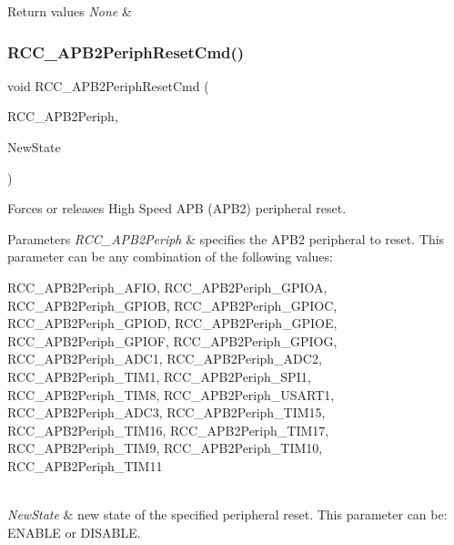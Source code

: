 \begin{DoxyRetVals}{Return values}
{\em None} & \\
\hline
\end{DoxyRetVals}
\mbox{\label{group___r_c_c___exported___functions_gad94553850ac07106a27ee85fec37efdf}} 
\subsubsection{\texorpdfstring{RCC\_APB2PeriphResetCmd()}{RCC\_APB2PeriphResetCmd()}}
{\footnotesize\ttfamily void R\+C\+C\+\_\+\+A\+P\+B2\+Periph\+Reset\+Cmd (\begin{DoxyParamCaption}\item[{uint32\+\_\+t}]{R\+C\+C\+\_\+\+A\+P\+B2\+Periph,  }\item[{\mbox{\hyperlink{group___exported__types_gac9a7e9a35d2513ec15c3b537aaa4fba1}{Functional\+State}}}]{New\+State }\end{DoxyParamCaption})}



Forces or releases High Speed A\+PB (A\+P\+B2) peripheral reset. 


\begin{DoxyParams}{Parameters}
{\em R\+C\+C\+\_\+\+A\+P\+B2\+Periph} & specifies the A\+P\+B2 peripheral to reset. This parameter can be any combination of the following values\+: \begin{DoxyItemize}
\item R\+C\+C\+\_\+\+A\+P\+B2\+Periph\+\_\+\+A\+F\+IO, R\+C\+C\+\_\+\+A\+P\+B2\+Periph\+\_\+\+G\+P\+I\+OA, R\+C\+C\+\_\+\+A\+P\+B2\+Periph\+\_\+\+G\+P\+I\+OB, R\+C\+C\+\_\+\+A\+P\+B2\+Periph\+\_\+\+G\+P\+I\+OC, R\+C\+C\+\_\+\+A\+P\+B2\+Periph\+\_\+\+G\+P\+I\+OD, R\+C\+C\+\_\+\+A\+P\+B2\+Periph\+\_\+\+G\+P\+I\+OE, R\+C\+C\+\_\+\+A\+P\+B2\+Periph\+\_\+\+G\+P\+I\+OF, R\+C\+C\+\_\+\+A\+P\+B2\+Periph\+\_\+\+G\+P\+I\+OG, R\+C\+C\+\_\+\+A\+P\+B2\+Periph\+\_\+\+A\+D\+C1, R\+C\+C\+\_\+\+A\+P\+B2\+Periph\+\_\+\+A\+D\+C2, R\+C\+C\+\_\+\+A\+P\+B2\+Periph\+\_\+\+T\+I\+M1, R\+C\+C\+\_\+\+A\+P\+B2\+Periph\+\_\+\+S\+P\+I1, R\+C\+C\+\_\+\+A\+P\+B2\+Periph\+\_\+\+T\+I\+M8, R\+C\+C\+\_\+\+A\+P\+B2\+Periph\+\_\+\+U\+S\+A\+R\+T1, R\+C\+C\+\_\+\+A\+P\+B2\+Periph\+\_\+\+A\+D\+C3, R\+C\+C\+\_\+\+A\+P\+B2\+Periph\+\_\+\+T\+I\+M15, R\+C\+C\+\_\+\+A\+P\+B2\+Periph\+\_\+\+T\+I\+M16, R\+C\+C\+\_\+\+A\+P\+B2\+Periph\+\_\+\+T\+I\+M17, R\+C\+C\+\_\+\+A\+P\+B2\+Periph\+\_\+\+T\+I\+M9, R\+C\+C\+\_\+\+A\+P\+B2\+Periph\+\_\+\+T\+I\+M10, R\+C\+C\+\_\+\+A\+P\+B2\+Periph\+\_\+\+T\+I\+M11\end{DoxyItemize}
\\
\hline
{\em New\+State} & new state of the specified peripheral reset. This parameter can be\+: E\+N\+A\+B\+LE or D\+I\+S\+A\+B\+LE. \\
\hline
\end{DoxyParams}

